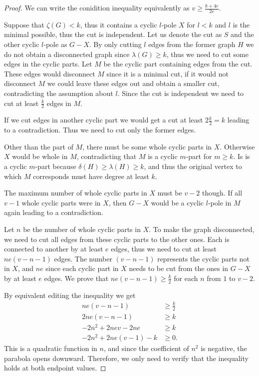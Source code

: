 \documentclass[12pt, twoside]{book}
\begin{document}
\begin{proof}
	We can write the conidition inequality equivalently as $v\geq \frac{k+4e}{2e}$.
	
	Suppose that $\zeta(G)<k$, thus it contains a cyclic $l$-pole $X$ for $l<k$ and $l$ is the minimal possible, thus the cut is independent. Let us denote the cut as $S$ and the other cyclic $l$-pole as $G-X$. By only cutting $l$ edges from the former graph $H$ we do not obtain a disconnected graph since $\lambda(G)\geq k$, thus we need to cut some edges in the cyclic parts. Let $M$ be the cyclic part containing edges from the cut. These edges would disconnect $M$ since it is a minimal cut, if it would not disconnect $M$ we could leave these edges out and obtain a smaller cut, contradicting the assumption about $l$. Since the cut is independent we need to cut at least $\frac{k}{2}$ edges in $M$.
	
	If we cut edges in another cyclic part we would get a cut at least $2\frac{k}{2}=k$ leading to a contradiction. Thus we need to cut only the former edges.
	
	Other than the part of $M$, there must be some whole cyclic parts in $X$. Otherwise $X$ would be whole in $M$, contradicting that $M$ is a cyclic $m$-part for $m\geq k$. Is is a cyclic $m$-part because $\delta(H)\geq \lambda(H)\geq k$, and thus the original vertex to which $M$ corresponds must have degree at least $k$.
	
	The maximum number of whole cyclic parts in $X$ must be $v-2$ though. If all $v-1$ whole cyclic parts were in $X$, then $G-X$ would be a cyclic $l$-pole in $M$ again leading to a contradiction.
	
	Let $n$ be the number of whole cyclic parts in $X$. To make the graph disconnected, we need to cut all edges from these cyclic parts to the other ones. Each is connected to another by at least $e$ edges, thus we need to cut at least $ne(v-n-1)$ edges. The number $(v-n-1)$ represents the cyclic parts not in $X$, and $ne$ since each cyclic part in $X$ needs to be cut from the ones in $G-X$ by at least $e$ edges. We prove that $ne(v-n-1)\geq\frac{k}{2}$ for each $n$ from $1$ to $v-2$.
	
	By equivalent editing the inequality we get
	\begin{align*}
		ne(v-n-1)&\geq\frac{k}{2} \\
		2ne(v-n-1)&\geq k \\
		-2n^2+2nev-2ne&\geq k \\
		-2n^2+2ne(v-1)-k&\geq 0.
	\end{align*}
	This is a quadratic function in $n$, and since the coefficient of $n^2$ is negative, the parabola opens downward. Therefore, we only need to verify that the inequality holds at both endpoint values.
	

\end{proof}
\end{document}
